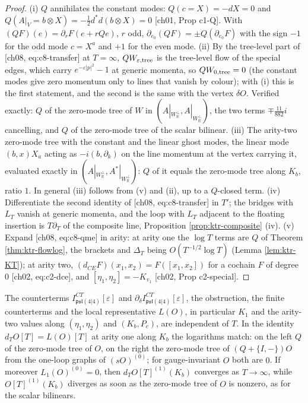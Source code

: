 \begin{proof}
(i) $Q$ annihilates the constant modes: $Q(c=X)=-dX=0$ and $Q(A|_V=b\otimes X)=-\tfrac12d^*d(b\otimes X)=0$ [ch01, Prop c1-Q]. With $(QF)(e)=\partial_rF(e+rQe)$, $r$ odd, $\partial_{e_0}(QF)=\pm Q(\partial_{e_0}F)$ with the sign $-1$ for the odd mode $c=X^a$ and $+1$ for the even mode. (ii) By the tree-level part of [ch08, eq:c8-transfer] at $T=\infty$, $QW_{\varepsilon,\rm tree}$ is the tree-level flow of the special edges, which carry $e^{-\varepsilon|p|^2}-1$ at generic momenta, so $QW_{0,\rm tree}=0$ (the constant modes give zero momentum only to lines that vanish by colour); with (i) this is the first statement, and the second is the same with the vertex $\delta O$. Verified exactly: $Q$ of the zero-mode tree of $W$ in $(A|_{W_{\mathbb R}^\perp},A|_{W_{\mathbb R}^\perp})$, the two terms $\mp\tfrac{11}{882}i$ cancelling, and $Q$ of the zero-mode tree of the scalar bilinear. (iii) The arity-two zero-mode tree with the constant and the linear ghost modes, the linear mode $(b,x)X_a$ acting as $-i(b,\partial_k)$ on the line momentum at the vertex carrying it, evaluated exactly in $(A|_{W_{\mathbb R}^\perp},A^*|_{W_{\mathbb R}^\perp})$: $Q$ of it equals the zero-mode tree along $K_b$, ratio $1$. In general (iii) follows from (v) and (ii), up to a $Q$-closed term. (iv) Differentiate the second identity of [ch08, eq:c8-transfer] in $T'$; the bridges with $L_T$ vanish at generic momenta, and the loop with $L_T$ adjacent to the floating insertion is $T\partial_T$ of the composite line, Proposition \ref{prop:ktr-composite} (iv). (v) Expand [ch08, eq:c8-qme] in arity: at arity one the $\log T$ terms are $Q$ of Theorem \ref{thm:ktr-flowlog}, the brackets and $\Delta_T$ being $O(T^{-1/2}\log T)$ (Lemma \ref{lem:ktr-KT}); at arity two, $(d_{CE}F)(x_1,x_2)=F([x_1,x_2])$ for a cochain $F$ of degree $0$ [ch02, eq:c2-dce], and $[\eta_1,\eta_2]=-K_{v_1}$ [ch02, Prop c2-special].
\end{proof}

\begin{theorem}
\label{thm:ktr-nocore}
The counterterms $I^{CT}_{\mathfrak{psl}(4|4)}[\varepsilon]$ and $\partial_\delta I^{CT}_{\mathfrak{psl}(4|4)}[\varepsilon]$, the obstruction, the finite counterterms and the local representative $L(O)$, in particular $K_1$ and the arity-two values along $(\eta_1,\eta_2)$ and $(K_b,P_c)$, are independent of $T$. In the identity $d_TO[T]=L(O)[T]$ at arity one along $K_b$ the logarithms match: on the left $Q$ of the zero-mode tree of $O$, on the right the zero-mode tree of $(Q+\{I,-\})O$ from the one-loop graphs of $(sO)^{(0)}$; for gauge-invariant $O$ both are $0$. If moreover $L_1(O)^{(0)}=0$, then $d_TO[T]^{(1)}(K_b)$ converges as $T\to\infty$, while $O[T]^{(1)}(K_b)$ diverges as soon as the zero-mode tree of $O$ is nonzero, as for the scalar bilinears.
\end{theorem}

